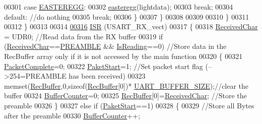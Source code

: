 \begin{DoxyCode}
{00301                 \textcolor{keywordflow}{case} \hyperlink{_led_effects_8h_a5645ec20d3cd39bfc1c9ad5ec99db2f2}{EASTEREGG}:
00302                     \hyperlink{_led_effects_8c_a25e09bcb1481b20ebc2a27e7098b5115}{easteregg}(lightdata);
00303                     \textcolor{keywordflow}{break};
00304                 \textcolor{keywordflow}{default}:    \textcolor{comment}{//do nothing}
00305                     \textcolor{keywordflow}{break};
00306             \}
00307         \}
00308         
00309         
00310     \}
00311       
00312 \}
00313 
00314 
\hypertarget{ws2811lichterkette_8c_source_l00316}{}\hyperlink{ws2811lichterkette_8c_a09ce999e15ad60b8a3f07d08af1946f9}{00316} \hyperlink{ws2811lichterkette_8c_a09ce999e15ad60b8a3f07d08af1946f9}{ISR} (USART\_RX\_vect)
00317 \{
00318     \hyperlink{globals_8h_ab5490074aaca289e986e9a00e0c25663}{ReceivedChar} = UDR0;                            \textcolor{comment}{//Read data from the RX buffer     }
00319     \textcolor{keywordflow}{if} (\hyperlink{globals_8h_ab5490074aaca289e986e9a00e0c25663}{ReceivedChar}==\hyperlink{ws2811lichterkette_8c_a8aac8c5098aaf915463fb31715efa09f}{PREAMBLE} && \hyperlink{globals_8h_a922ad5baed647eca43ad1a979e162ebd}{IsReading}==0)        \textcolor{comment}{//Store data in the
       RecBuffer array only if it is not accessed by the main function}
00320     \{
00321         \hyperlink{globals_8h_a1b09d1a5bcf4c8ab435bb3c9e36def59}{PacketComplete}=0;
00322         \hyperlink{globals_8h_aaa3bddd2273257ac5ec259197b62e984}{PaketStart}=1;                             \textcolor{comment}{//Set packet start flag (-->254=PREAMBLE has
       been received)}
00323         memset(\hyperlink{globals_8h_a5d735865707e6694a8173d629e0b4d5c}{RecBuffer},0,\textcolor{keyword}{sizeof}(\hyperlink{globals_8h_a5d735865707e6694a8173d629e0b4d5c}{RecBuffer}[0])*
      \hyperlink{globals_8h_a0d57378e32bf8278011460740bc29f7f}{UART\_BUFFER\_SIZE});\textcolor{comment}{//clear the buffer    }
00324         \hyperlink{globals_8h_aa6fcb4d4fca4554ac73bef10668c23cd}{BufferCounter}=0;
00325         \hyperlink{globals_8h_a5d735865707e6694a8173d629e0b4d5c}{RecBuffer}[0]=\hyperlink{globals_8h_ab5490074aaca289e986e9a00e0c25663}{ReceivedChar};                 \textcolor{comment}{//Store the preamble}
00326     \}
00327     \textcolor{keywordflow}{else} \textcolor{keywordflow}{if} (\hyperlink{globals_8h_aaa3bddd2273257ac5ec259197b62e984}{PaketStart}==1)
00328     \{
00329         \textcolor{comment}{//Store all Bytes after the preamble}
00330         \hyperlink{globals_8h_aa6fcb4d4fca4554ac73bef10668c23cd}{BufferCounter}++;    
}
\end{DoxyCode}
